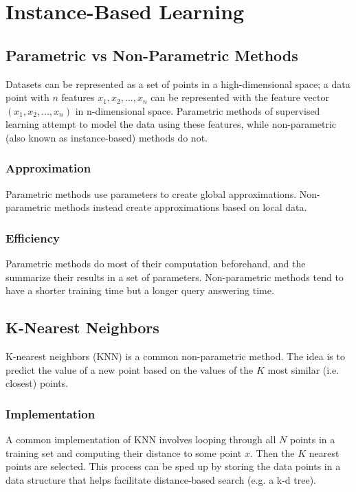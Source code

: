 \documentclass[12pt]{article}
\begin{document}
\section{Instance-Based Learning}
    \subsection{Parametric vs Non-Parametric Methods}
        Datasets can be represented as a set of points in a high-dimensional space; a data point with $n$ features $x_1,
        x_2, ..., x_n$ can be represented with the feature vector $(x_1, x_2, ..., x_n)$ in n-dimensional space.
        Parametric methods of supervised learning attempt to model the data using these features, while non-parametric
        (also known as instance-based) methods do not.

        \subsubsection{Approximation}
            Parametric methods use parameters to create global approximations. Non-parametric methods instead create
            approximations based on local data.

        \subsubsection{Efficiency}
            Parametric methods do most of their computation beforehand, and the summarize their results in a set of
            parameters. Non-parametric methods tend to have a shorter training time but a longer query answering time.

    \subsection{K-Nearest Neighbors} \label{sec:KNN} K-nearest neighbors (KNN) is a common non-parametric method. The
        idea is to predict the value of a new point based on the values of the $K$ most similar (i.e. closest) points.

        \subsubsection{Implementation}
            A common implementation of KNN involves looping through all $N$ points in a training set and computing their
            distance to some point $x$. Then the $K$ nearest points are selected. This process can be sped up by storing
            the data points in a data structure that helps facilitate distance-based search (e.g. a k-d tree).
\end{document}
